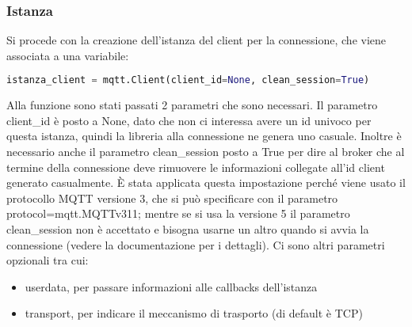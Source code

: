 \subsubsection{Istanza}
\label{subsubsec:client-creazione-connesione-istanza}
Si procede con la creazione dell'istanza del client per la connessione, che viene associata a una variabile:
\begin{lstlisting}[language=python]
	istanza_client = mqtt.Client(client_id=None, clean_session=True)
\end{lstlisting}
Alla funzione sono stati passati 2 parametri che sono necessari.
Il parametro client\_id è posto a None, dato che non ci interessa avere un id univoco per questa istanza,
quindi la libreria alla connessione ne genera uno casuale.
Inoltre è necessario anche il parametro clean\_session posto a True per dire al broker che al termine della connessione
deve rimuovere le informazioni collegate all'id client generato casualmente.
È stata applicata questa impostazione perché viene usato il protocollo MQTT versione 3,
che si può specificare con il parametro protocol=mqtt.MQTTv311; mentre se si usa la versione 5 il parametro clean\_session non è accettato 
e bisogna usarne un altro quando si avvia la connessione (vedere la documentazione per i dettagli).
Ci sono altri parametri opzionali tra cui:
\begin{itemize}
	\item userdata, per passare informazioni alle callbacks dell'istanza
	\item transport, per indicare il meccanismo di trasporto (di default è TCP)
\end{itemize}

